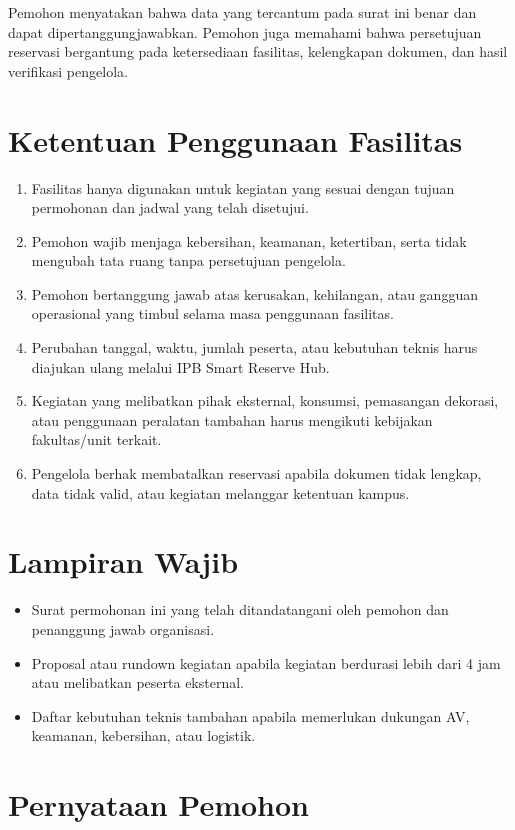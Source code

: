 \documentclass[11pt,a4paper]{article}
\begin{document}
Pemohon menyatakan bahwa data yang tercantum pada surat ini benar dan dapat dipertanggungjawabkan. Pemohon juga memahami bahwa persetujuan reservasi bergantung pada ketersediaan fasilitas, kelengkapan dokumen, dan hasil verifikasi pengelola.

\section*{Ketentuan Penggunaan Fasilitas}
\begin{enumerate}
  \item Fasilitas hanya digunakan untuk kegiatan yang sesuai dengan tujuan permohonan dan jadwal yang telah disetujui.
  \item Pemohon wajib menjaga kebersihan, keamanan, ketertiban, serta tidak mengubah tata ruang tanpa persetujuan pengelola.
  \item Pemohon bertanggung jawab atas kerusakan, kehilangan, atau gangguan operasional yang timbul selama masa penggunaan fasilitas.
  \item Perubahan tanggal, waktu, jumlah peserta, atau kebutuhan teknis harus diajukan ulang melalui IPB Smart Reserve Hub.
  \item Kegiatan yang melibatkan pihak eksternal, konsumsi, pemasangan dekorasi, atau penggunaan peralatan tambahan harus mengikuti kebijakan fakultas/unit terkait.
  \item Pengelola berhak membatalkan reservasi apabila dokumen tidak lengkap, data tidak valid, atau kegiatan melanggar ketentuan kampus.
\end{enumerate}

\section*{Lampiran Wajib}
\begin{itemize}
  \item Surat permohonan ini yang telah ditandatangani oleh pemohon dan penanggung jawab organisasi.
  \item Proposal atau rundown kegiatan apabila kegiatan berdurasi lebih dari 4 jam atau melibatkan peserta eksternal.
  \item Daftar kebutuhan teknis tambahan apabila memerlukan dukungan AV, keamanan, kebersihan, atau logistik.
\end{itemize}

\section*{Pernyataan Pemohon}
\end{document}

